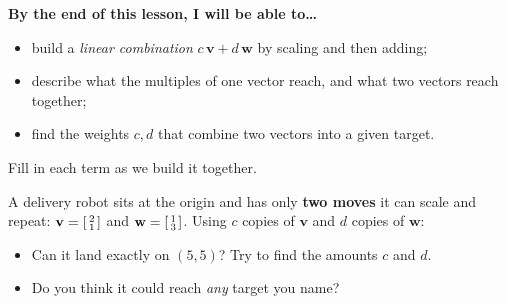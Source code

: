 \documentclass[10pt]{article}
\newcommand{\vv}{\mathbf{v}}
\newcommand{\ww}{\mathbf{w}}
\begin{document}

\vspace{0.12in}

\begin{objectivebox}
\textbf{By the end of this lesson, I will be able to\dots}
\begin{itemize}\setlength{\itemsep}{2pt}
  \item build a \emph{linear combination} $c\,\vv + d\,\ww$ by scaling and then adding;
  \item describe what the multiples of one vector reach, and what two vectors reach together;
  \item find the weights $c,d$ that combine two vectors into a given target.
\end{itemize}
\end{objectivebox}

\vspace{0.10in}

\begin{vocabbox}
\small
Fill in each term as we build it together.
\par\vspace{2pt}
\end{vocabbox}

\begin{hookbox}
A delivery robot sits at the origin and has only \textbf{two moves} it can scale and repeat:
$\vv = \begin{bsmallmatrix} 2 \\ 1 \end{bsmallmatrix}$ and
$\ww = \begin{bsmallmatrix} 1 \\ 3 \end{bsmallmatrix}$. Using $c$ copies of $\vv$ and $d$ copies
of $\ww$:
\begin{itemize}\setlength{\itemsep}{1pt}
  \item Can it land exactly on $(5,5)$? Try to find the amounts $c$ and $d$. \blank{3.2cm}
  \item Do you think it could reach \emph{any} target you name? \writeline
\end{itemize}
\end{hookbox}
\end{document}
